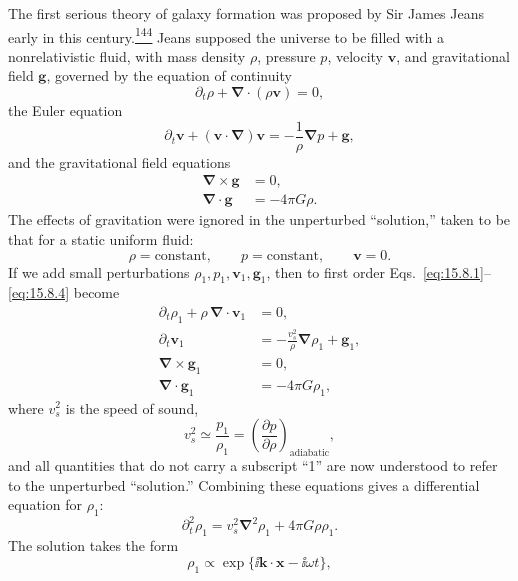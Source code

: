 The first serious theory of galaxy formation was proposed by Sir James Jeans
early in this century.\hyperref[ch15-ref-144]{\textsuperscript{144}} Jeans
supposed the universe to be filled with a nonrelativistic fluid, with mass
density \(\rho\), pressure \(p\), velocity \(\mathbf v\), and gravitational
field \(\mathbf g\), governed by the equation of continuity
\begin{equation}
  \partial_t\rho
  +
  \boldsymbol{\nabla}\cdot(\rho\mathbf v)
  =
  0,
  \tag{15.8.1}\label{eq:15.8.1}
\end{equation}
the Euler equation
\begin{equation}
  \partial_t\mathbf v
  +
  (\mathbf v\cdot\boldsymbol{\nabla})\mathbf v
  =
  -\frac1\rho\boldsymbol{\nabla}p+\mathbf g,
  \tag{15.8.2}\label{eq:15.8.2}
\end{equation}
and the gravitational field equations
\begin{align}
  \boldsymbol{\nabla}\times\mathbf g
  &=0,
  \tag{15.8.3}\label{eq:15.8.3}\\
  \boldsymbol{\nabla}\cdot\mathbf g
  &=-4\pi G\rho.
  \tag{15.8.4}\label{eq:15.8.4}
\end{align}
The effects of gravitation were ignored in the unperturbed ``solution,''
taken to be that for a static uniform fluid:
\[
  \rho=\text{constant},
  \qquad
  p=\text{constant},
  \qquad
  \mathbf v=0.
\]
If we add small perturbations
\(\rho_1,p_1,\mathbf v_1,\mathbf g_1\), then to first order
Eqs.~\eqref{eq:15.8.1}--\eqref{eq:15.8.4} become
\[
  \begin{aligned}
    \partial_t\rho_1
    +\rho\,\boldsymbol{\nabla}\cdot\mathbf v_1
    &=0,
    \\
    \partial_t\mathbf v_1
    &=
    -\frac{v_s^2}{\rho}\boldsymbol{\nabla}\rho_1+\mathbf g_1,
    \\
    \boldsymbol{\nabla}\times\mathbf g_1
    &=0,
    \\
    \boldsymbol{\nabla}\cdot\mathbf g_1
    &=-4\pi G\rho_1,
  \end{aligned}
\]
where \(v_s^2\) is the speed of sound,
\[
  v_s^2
  \simeq
  \frac{p_1}{\rho_1}
  =
  \left(\frac{\partial p}{\partial\rho}\right)_{\mathrm{adiabatic}},
\]
and all quantities that do not carry a subscript ``1'' are now understood to
refer to the unperturbed ``solution.'' Combining these equations gives a
differential equation for \(\rho_1\):
\[
  \partial_t^2\rho_1
  =
  v_s^2\boldsymbol{\nabla}^2\rho_1
  +
  4\pi G\rho\rho_1.
\]
The solution takes the form
\begin{equation}
  \rho_1
  \propto
  \exp\{\ii\mathbf k\cdot\mathbf x-\ii\omega t\},
  \tag{15.8.5}\label{eq:15.8.5}
\end{equation}
